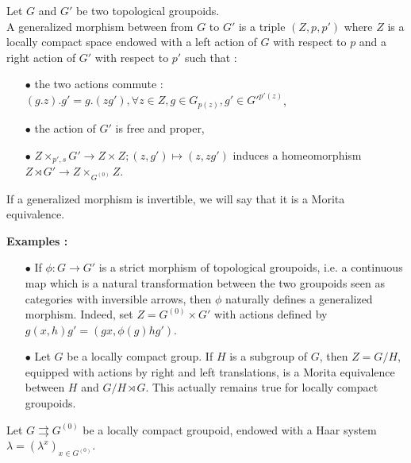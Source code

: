 \begin{definition}
Let $G$ and $G'$ be two topological groupoids.\\ 
A generalized morphism between from $G$ to $G'$ is a triple $(Z,p,p')$ where $Z$ is a locally compact space endowed with a left action of $G$ with respect to $p$ and a right action of $G'$ with respect to $p'$ such that :
\begin{itemize}
\item[$\bullet$] the two actions commute : $(g.z).g'=g.(zg'),\forall z\in Z,g\in G_{p(z)},g'\in G'^{p'(z)}$,
\item[$\bullet$] the action of $G'$ is free and proper,
\item[$\bullet$] $Z\times_{p',s} G'\rightarrow Z\times Z ; (z,g')\mapsto (z,zg')$ induces a homeomorphism $Z\rtimes G' \rightarrow Z\times_{G^{(0)}} Z$.\\
\end{itemize}
If a generalized morphism is invertible, we will say that it is a Morita equivalence.
\end{definition}

\textbf{Examples :}
\begin{itemize}
\item[$\bullet$] If $\phi : G\rightarrow G'$ is a strict morphism of topological groupoids, i.e. a continuous map which is a natural transformation between the two groupoids seen as categories with inversible arrows, then $\phi$ naturally defines a generalized morphism. Indeed, set $Z = G^{(0)}\times G'$ with actions defined by $g(x,h)g' = (gx, \phi(g)hg')$.
\item[$\bullet$] Let $G$ be a locally compact group. If $H$ is a subgroup of $G$, then $Z=G/H$, equipped with actions by right and left translations, is a Morita equivalence between $H$ and $G/H\rtimes G$. This actually remains true for locally compact groupoids.\\
\end{itemize}

Let $G \rightrightarrows G^{(0)}$ be a locally compact groupoid, endowed with a Haar system $\lambda = (\lambda^x)_{x\in G^{(0)}}$.\\


